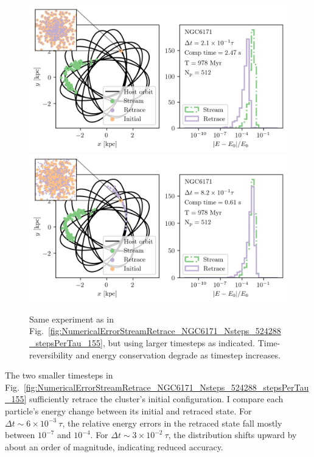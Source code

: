         \begin{figure}
            \centering
            \includegraphics[width=\linewidth]{images/NumericalErrorStreamRetrace_NGC6171_Nsteps_16384_stepsPerTau_4.png}
            \includegraphics[width=\linewidth]{images/NumericalErrorStreamRetrace_NGC6171_Nsteps_4096_stepsPerTau_1.png}
            \caption{Same experiment as in Fig.~\ref{fig:NumericalErrorStreamRetrace_NGC6171_Nsteps_524288_stepsPerTau_155}, but using larger timesteps as indicated. Time-reversibility and energy conservation degrade as timestep increases.}
            \label{fig:NumericalErrorStreamRetrace_NGC6171_Nsteps_4096_stepsPerTau_1}
        \end{figure}
        The two smaller timesteps in Fig.~\ref{fig:NumericalErrorStreamRetrace_NGC6171_Nsteps_524288_stepsPerTau_155} sufficiently retrace the cluster's initial configuration. I compare each particle's energy change between its initial and retraced state. For $\Delta t \sim 6\times10^{-3}~\tau$, the relative energy errors in the retraced state fall mostly between $10^{-7}$ and $10^{-4}$. For $\Delta t \sim 3\times10^{-2}~\tau$, the distribution shifts upward by about an order of magnitude, indicating reduced accuracy.

